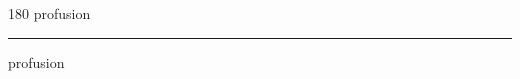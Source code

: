 
\begin{frame}
\begin{center}
\begin{turn}{180}
{\fontsize{2.5cm}{1em}\selectfont profusion}
\end{turn}
\vspace{1em}\par  
\hrule
\vspace{1em}\par  
{\fontsize{2.5cm}{1em}\selectfont profusion}
\end{center}
\end{frame}
